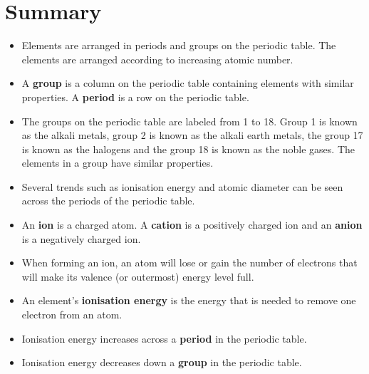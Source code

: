             \section{Summary}
            \nopagebreak
            \label{m38757*uid0123}\begin{itemize}[noitemsep]
            \label{m38757*id79342}\item Elements are arranged in periods and groups on the periodic table. The elements are arranged according to increasing atomic number. 
\label{m38757*id97342}\item A \textbf{group} is a column on the periodic table containing elements with similar properties. A \textbf{period} is a row on the periodic table.
\item The groups on the periodic table are labeled from 1 to 18. Group 1 is known as the alkali metals, group 2 is known as the alkali earth metals, the group 17 is known as the halogens and the group 18 is known as the noble gases. The elements in a group have similar properties.\item Several trends such as ionisation energy and atomic diameter can be seen across the periods of the periodic table. \label{m38757*uid184}\item An \textbf{ion} is a charged atom. A \textbf{cation} is a positively charged ion and an \textbf{anion} is a negatively charged ion.
\label{m38757*uid185}\item When forming an ion, an atom will lose or gain the number of electrons that will make its valence (or outermost) energy level full.
\label{m38757*uid186}\item An element's \textbf{ionisation energy} is the energy that is needed to remove one electron from an atom.
\label{m38757*uid187}\item Ionisation energy increases across a \textbf{period} in the periodic table.
\label{m38757*uid188}\item Ionisation energy decreases down a \textbf{group} in the periodic table.
\end{itemize}
        \label{m38757*eip-219}
            



